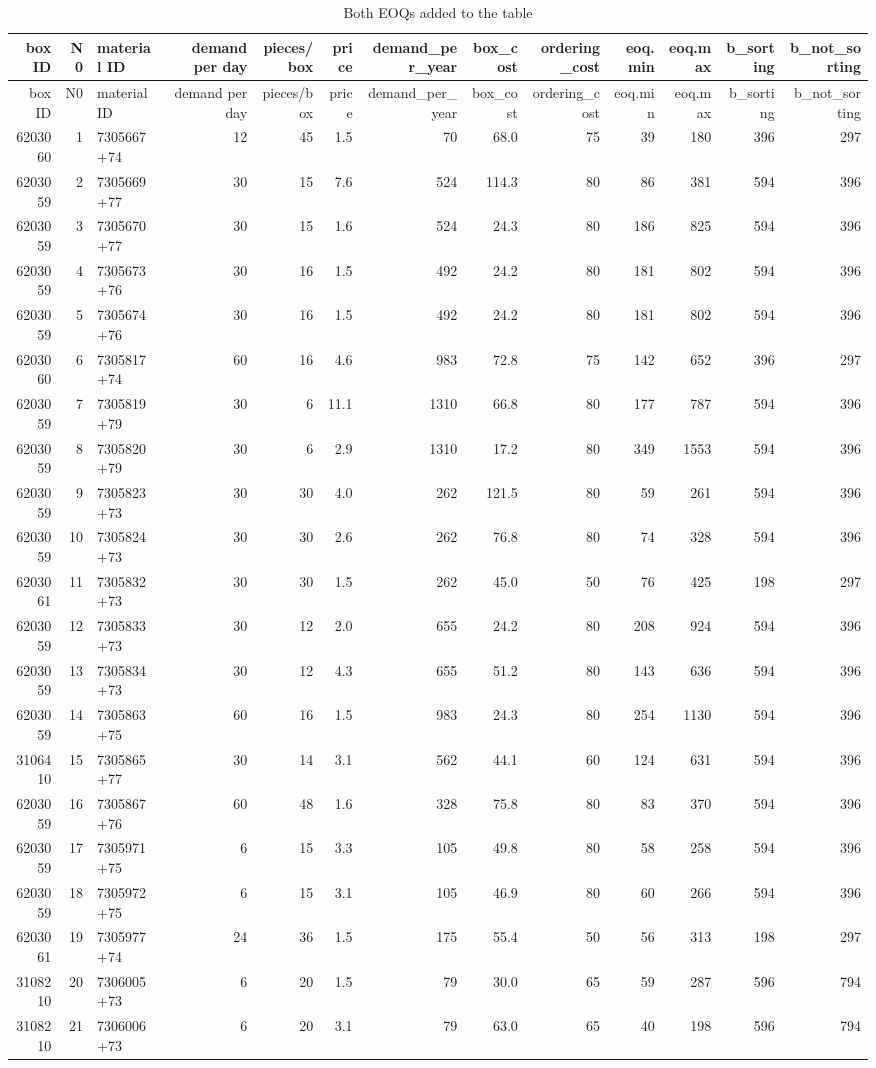 \documentclass[
]{article}
\begin{document}
\begin{longtable}[]{@{}rrlrrrrrrrrrr@{}}
\caption{Both EOQs added to the table}\tabularnewline
\toprule
box ID & N0 & material ID & demand per day & pieces/box & price &
demand\_per\_year & box\_cost & ordering\_cost & eoq.min & eoq.max &
b\_sorting & b\_not\_sorting\tabularnewline
\midrule
\endfirsthead
\toprule
box ID & N0 & material ID & demand per day & pieces/box & price &
demand\_per\_year & box\_cost & ordering\_cost & eoq.min & eoq.max &
b\_sorting & b\_not\_sorting\tabularnewline
\midrule
\endhead
6203060 & 1 & 7305667+74 & 12 & 45 & 1.5 & 70 & 68.0 & 75 & 39 & 180 &
396 & 297\tabularnewline
6203059 & 2 & 7305669+77 & 30 & 15 & 7.6 & 524 & 114.3 & 80 & 86 & 381 &
594 & 396\tabularnewline
6203059 & 3 & 7305670+77 & 30 & 15 & 1.6 & 524 & 24.3 & 80 & 186 & 825 &
594 & 396\tabularnewline
6203059 & 4 & 7305673+76 & 30 & 16 & 1.5 & 492 & 24.2 & 80 & 181 & 802 &
594 & 396\tabularnewline
6203059 & 5 & 7305674+76 & 30 & 16 & 1.5 & 492 & 24.2 & 80 & 181 & 802 &
594 & 396\tabularnewline
6203060 & 6 & 7305817+74 & 60 & 16 & 4.6 & 983 & 72.8 & 75 & 142 & 652 &
396 & 297\tabularnewline
6203059 & 7 & 7305819+79 & 30 & 6 & 11.1 & 1310 & 66.8 & 80 & 177 & 787
& 594 & 396\tabularnewline
6203059 & 8 & 7305820+79 & 30 & 6 & 2.9 & 1310 & 17.2 & 80 & 349 & 1553
& 594 & 396\tabularnewline
6203059 & 9 & 7305823+73 & 30 & 30 & 4.0 & 262 & 121.5 & 80 & 59 & 261 &
594 & 396\tabularnewline
6203059 & 10 & 7305824+73 & 30 & 30 & 2.6 & 262 & 76.8 & 80 & 74 & 328 &
594 & 396\tabularnewline
6203061 & 11 & 7305832+73 & 30 & 30 & 1.5 & 262 & 45.0 & 50 & 76 & 425 &
198 & 297\tabularnewline
6203059 & 12 & 7305833+73 & 30 & 12 & 2.0 & 655 & 24.2 & 80 & 208 & 924
& 594 & 396\tabularnewline
6203059 & 13 & 7305834+73 & 30 & 12 & 4.3 & 655 & 51.2 & 80 & 143 & 636
& 594 & 396\tabularnewline
6203059 & 14 & 7305863+75 & 60 & 16 & 1.5 & 983 & 24.3 & 80 & 254 & 1130
& 594 & 396\tabularnewline
3106410 & 15 & 7305865+77 & 30 & 14 & 3.1 & 562 & 44.1 & 60 & 124 & 631
& 594 & 396\tabularnewline
6203059 & 16 & 7305867+76 & 60 & 48 & 1.6 & 328 & 75.8 & 80 & 83 & 370 &
594 & 396\tabularnewline
6203059 & 17 & 7305971+75 & 6 & 15 & 3.3 & 105 & 49.8 & 80 & 58 & 258 &
594 & 396\tabularnewline
6203059 & 18 & 7305972+75 & 6 & 15 & 3.1 & 105 & 46.9 & 80 & 60 & 266 &
594 & 396\tabularnewline
6203061 & 19 & 7305977+74 & 24 & 36 & 1.5 & 175 & 55.4 & 50 & 56 & 313 &
198 & 297\tabularnewline
3108210 & 20 & 7306005+73 & 6 & 20 & 1.5 & 79 & 30.0 & 65 & 59 & 287 &
596 & 794\tabularnewline
3108210 & 21 & 7306006+73 & 6 & 20 & 3.1 & 79 & 63.0 & 65 & 40 & 198 &
596 & 794\tabularnewline

\end{longtable}
\end{document}
